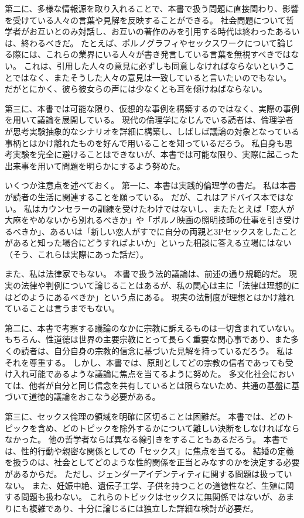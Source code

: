 \documentclass[paper=a4,book,openany]{jlreq} \usepackage{mystyle}
\begin{document}
第二に、多様な情報源を取り入れることで、本書で扱う問題に直接関わり、影響を受けている人々の言葉や見解を反映することができる。
社会問題について哲学者がお互いとのみ対話し、お互いの著作のみを引用する時代は終わった{\DDASH}あるいは、終わるべきだ。
たとえば、ポルノグラフィやセックスワークについて論じる際には、これらの業界にいる人々が書き発言している言葉を無視すべきではない。
これは、引用した人々の意見に必ずしも同意しなければならないということではなく、またそうした人々の意見は一致していると言いたいのでもない。
だがとにかく、彼ら彼女らの声には少なくとも耳を傾けねばならない。

第三に、本書では可能な限り、仮想的な事例を構築するのではなく、実際の事例を用いて議論を展開している。
現代の倫理学になじんでいる読者は、倫理学者が思考実験{\DDASH}抽象的なシナリオを詳細に構築し、しばしば議論の対象となっている事柄とはかけ離れたもの{\DDASH}を好んで用いることを知っているだろう。
私自身も思考実験を完全に避けることはできないが、本書では可能な限り、実際に起こった出来事を用いて問題を明らかにするよう努めた。

いくつか注意点を述べておく。
第一に、本書は実践的倫理学の書だ。
私は本書が読者の生活に関連することを願っている。
だが、これはアドバイス本ではない。
私はカウンセラーの訓練を受けたわけではないし、またたとえば「恋人が大麻をやめないから別れるべきか」や「ポルノ映画の照明技師の仕事を引き受けるべきか」、あるいは「新しい恋人がすでに自分の両親と3Pセックスをしたことがあると知った場合にどうすればよいか」といった相談に答える立場にはない（そう、これらは実際にあった話だ\citep{savage21:_mum_dat}）。

また、私は法律家でもない。
本書で扱う法的議論は、前述の通り規範的だ。
現実の法律や判例について論じることはあるが、私の関心は主に「法律は理想的にはどのようにあるべきか」という点にある。
現実の法制度が理想とはかけ離れていることは言うまでもない。

第二に、本書で考察する議論のなかに宗教に訴えるものは一切含まれていない。
もちろん、性道徳は世界の主要宗教にとって長らく重要な関心事であり、また多くの読者は、自分自身の宗教的信念に基づいた見解を持っているだろう。
私はそれを尊重する。
しかし、本書では、原則としてどの宗教の信者であっても受け入れ可能であるような議論に焦点を当てるように努めた。
多文化社会においては、他者が自分と同じ信念を共有しているとは限らないため、共通の基盤に基づいて道徳的議論をおこなう必要がある。

第三に、セックス倫理の領域を明確に区切ることは困難だ。
本書では、どのトピックを含め、どのトピックを除外するかについて難しい決断をしなければならなかった。
他の哲学者ならば異なる線引きをすることもあるだろう。
本書では、性的行動や親密な関係としての「セックス」に焦点を当てる。
結婚の定義を扱うのは、社会としてどのような性的関係を正当とみなすのかを決定する必要があるからだ。
ただし、ジェンダーアイデンティティに関する問題は扱っていない。
また、妊娠中絶、遺伝子工学、子供を持つことの道徳性など、生殖に関する問題も扱わない。
これらのトピックはセックスに無関係ではないが、あまりにも複雑であり、十分に論じるには独立した詳細な検討が必要だ。
\end{document}
